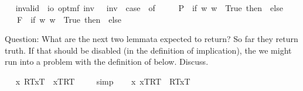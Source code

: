 \begin{isabellebody}
\ \isamarkupfalse%
\ invalid\ {\isacharcolon}{\isacharcolon}\ {\isachardoublequoteopen}io\ opt{\isasymRightarrow}mf{\isachardoublequoteclose}\ {\isacharparenleft}{\isachardoublequoteopen}{\isacharbrackleft}{\isacharunderscore}{\isacharbrackright}\isactrlsup i\isactrlsup n\isactrlsup v{\isachardoublequoteclose}\ {\isacharbrackleft}{}{\isacharbrackright}{\isacharparenright}\ \ {\isachardoublequoteopen}{\isacharbrackleft}{\isasymphi}{\isacharbrackright}\isactrlsup i\isactrlsup n\isactrlsup v\ {\isasymequiv}\ case\ {\isasymphi}\ of\ \isanewline
\ \ \ \ P{\isacharparenleft}{\isasympsi}{\isacharparenright}\ {\isasymRightarrow}\ if\ {\isasymforall}w{\isachardot}{\isasymnot}{\isacharparenleft}{\isasympsi}\ w{\isacharparenright}\ {\isasymlongleftrightarrow}\ True\ then\ {\isasymtop}\ else\ {\isasymbottom}\ \isanewline
\ \ {\isacharbar}\ F{\isacharparenleft}{\isasympsi}{\isacharparenright}\ {\isasymRightarrow}\ if\ {\isasymforall}w{\isachardot}{\isasymnot}{\isacharparenleft}{\isasympsi}\ w{\isacharparenright}\ {\isasymlongleftrightarrow}\ True\ then\ {\isasymtop}\ else\ {\isasymbottom}\ {\isacharbar}\ {\isacharunderscore}\ {\isasymRightarrow}\ {\isacharasterisk}{\isachardoublequoteclose}%
\isamarkuptrue%
%
\begin{isamarkuptext}%
Question: What are the next two lemmata expected to return? So far they return truth. If that should
  be disabled (in the definition of implication), the  we might run into a problem with the definition 
  of  below. Discuss.%
\end{isamarkuptext}%
\isamarkuptrue%
\ \isamarkupfalse%
\ {\isachardoublequoteopen}{\isacharbrackleft}{\isacharparenleft}\isactrlbold {\isasymforall}x{\isachardot}\ {\isasymlparr}R\isactrlsup T{\isacharcomma}x\isactrlsup T{\isasymrparr}\ \isactrlbold {\isasymrightarrow}\ {\isasymlbrace}x\isactrlsup T{\isacharcomma}R\isactrlsup T{\isasymrbrace}{\isacharparenright}{\isacharbrackright}\ {\isacharequal}\ {\isasymtop}{\isachardoublequoteclose}%
\isadelimproof
\ %
\endisadelimproof
%
\isatagproof
{}\isamarkupfalse%
\ simp\ \isamarkupfalse%
%
\endisatagproof
{\isafoldproof}%
%
\isadelimproof
%
\endisadelimproof
\isanewline
\ \isamarkupfalse%
\ {\isachardoublequoteopen}{\isacharbrackleft}{\isacharparenleft}\isactrlbold {\isasymforall}x{\isachardot}\ {\isasymlbrace}x\isactrlsup T{\isacharcomma}R\isactrlsup T{\isasymrbrace}\ \isactrlbold {\isasymrightarrow}\ {\isasymlparr}R\isactrlsup T{\isacharcomma}x\isactrlsup T{\isasymrparr}{\isacharparenright}{\isacharbrackright}\ {\isacharequal}\ {\isasymtop}{\isachardoublequoteclose}%

\end{isabellebody}
